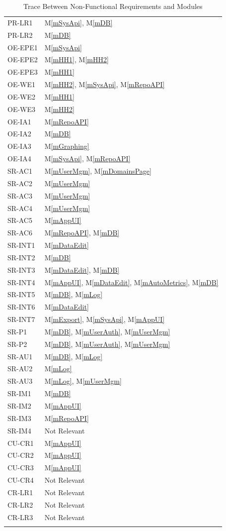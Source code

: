 \documentclass[12pt, titlepage]{article}
\newcommand{\mref}[1]{M\ref{#1}}
\begin{document}
\begin{longtable}{p{} p{}}
PR-LR1 & \mref{mSysApi}, \mref{mDB}\\
PR-LR2 & \mref{mDB}\\
OE-EPE1 & \mref{mSysApi}\\
OE-EPE2 & \mref{mHH1}, \mref{mHH2}\\
OE-EPE3 & \mref{mHH1}\\
OE-WE1 & \mref{mHH2}, \mref{mSysApi}, \mref{mRepoAPI}\\
OE-WE2 & \mref{mHH1}\\
OE-WE3 & \mref{mHH2}\\
OE-IA1 & \mref{mRepoAPI}\\
OE-IA2 & \mref{mDB}\\
OE-IA3 & \mref{mGraphing}\\
OE-IA4 & \mref{mSysApi}, \mref{mRepoAPI}\\
SR-AC1 & \mref{mUserMgm}, \mref{mDomainsPage}\\
SR-AC2 & \mref{mUserMgm}\\
SR-AC3 & \mref{mUserMgm}\\
SR-AC4 & \mref{mUserMgm}\\
SR-AC5 & \mref{mAppUI}\\
SR-AC6 & \mref{mRepoAPI}, \mref{mDB}\\
SR-INT1 & \mref{mDataEdit}\\
SR-INT2 & \mref{mDB}\\
SR-INT3 & \mref{mDataEdit}, \mref{mDB}\\
SR-INT4 & \mref{mAppUI}, \mref{mDataEdit}, \mref{mAutoMetrics}, \mref{mDB}\\
SR-INT5 & \mref{mDB}, \mref{mLog}\\
SR-INT6 & \mref{mDataEdit}\\
SR-INT7 & \mref{mExport}, \mref{mSysApi}, \mref{mAppUI}\\
SR-P1 & \mref{mDB}, \mref{mUserAuth}, \mref{mUserMgm}\\
SR-P2 & \mref{mDB}, \mref{mUserAuth}, \mref{mUserMgm}\\
SR-AU1 & \mref{mDB}, \mref{mLog}\\
SR-AU2 & \mref{mLog}\\
SR-AU3 & \mref{mLog}, \mref{mUserMgm}\\
SR-IM1 & \mref{mDB}\\
SR-IM2 & \mref{mAppUI}\\
SR-IM3 & \mref{mRepoAPI}\\
SR-IM4 & Not Relevant \\
CU-CR1 & \mref{mAppUI}\\
CU-CR2 & \mref{mAppUI}\\
CU-CR3 & \mref{mAppUI}\\
CU-CR4 & Not Relevant \\
CR-LR1 & Not Relevant \\
CR-LR2 & Not Relevant \\
CR-LR3 & Not Relevant \\
\bottomrule
\caption{Trace Between Non-Functional Requirements and Modules}
\label{tnf_modules}
\end{longtable}
\end{document}
